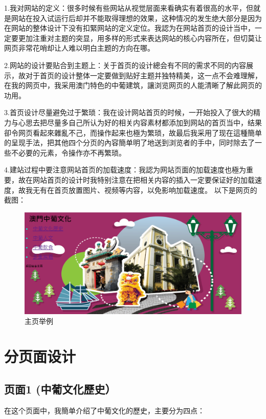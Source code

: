 \documentclass[supercite]{Experimental_Report}
\theoremstyle{definition}
\begin{document}
	1.我对网站的定义：很多时候有些网站从视觉层面来看确实有着很高的水平，但就是网站在投入试运行后却并不能取得理想的效果，这种情况的发生绝大部分是因为在网站的整体设计下没有扣緊网站的定义定位。我認为在网站首页的设计当中，一定要更加注重对主题的突显，用多样的形式来表达网站的核心内容所在，但切莫让网页非常花哨却让人难以明白主题的方向在哪。
	
	2.网站的设计要贴合到主题上：关于首页的设计總会有不同的需求不同的内容展示，故对于首页的设计整体一定要做到贴好主题并独特精美，这一点不会难理解，在我的网页中，我采用澳门特色的中葡建筑，讓浏览网页的人能清晰了解此网页的功用。
	
	3.首页设计尽量避免过于繁琐：我在设计网站首页的时候，一开始投入了很大的精力与心思去把尽量多自己所认为好的相关内容素材都添加到网站的首页当中，结果卻令网页看起來雜亂不己，而操作起来也極为繁琐，故最后我采用了现在這種簡单的呈现手法，把其他四个分页的內容簡单明了地送到浏览者的手中，同时除去了一些不必要的元素，令操作亦不再繁琐。
	
	4.建站过程中要注意网站首页的加载速度：我認为网站页面的加载速度也極为重要，故在网站首页的设计时我特别注意在把相关内容的插入一定要保证好的加载速度，故我无有在首页放置图片、视频等内容，以免影响加载速度。
	以下是网页的截图：
	\begin{figure}[htb]
		\begin{center}
			\includegraphics[scale=0.40]{images/2-1.jpg}
			\caption{主页举例}
			\label{fig2-1}
		\end{center}
	\end{figure}
	
	
	\newpage
	
	\section{分页面设计}
	
	
	\subsection{页面1 (中葡文化歷史）}
	在这个页面中，我簡单介绍了中葡文化的歷史，主要分为四点：
	
\end{document}
